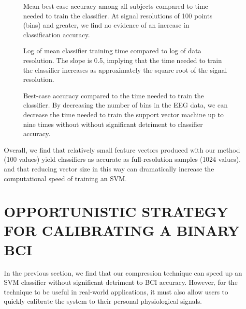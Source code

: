 \begin{figure}[!h]
  \centering
   {}
  \caption{Mean best-case accuracy among all subjects compared to time needed to train the classifier. At signal resolutions of 100 points (bins) and greater, we find no evidence of an increase in classification accuracy. }
  \label{fig:accuracy_vs_bins}
  \vspace{-0.1cm}
 \end{figure}

 \begin{figure}[!h]
  \vspace{-0.2cm}
  \centering
   {}
  \caption{Log of mean classifier training time compared to log of data resolution. The slope is 0.5, implying that the time needed to train the classifier increases as approximately the square root of the signal resolution.}
  \label{fig:training_vs_bins}
  \vspace{-0.1cm}
 \end{figure}

\begin{figure}[!h]
  \vspace{-0.2cm}
  \centering
   {}
  \caption{ Best-case accuracy compared to the time needed to train the classifier. By decreasing the number of bins in the EEG data, we can decrease the time needed to train the support vector machine up to nine times without without significant detriment to classifier accuracy. }
  \label{fig:accuracy_vs_training}
 \end{figure}

Overall, we find that relatively small feature vectors produced with our method (100 values) yield classifiers as accurate as full-resolution samples (1024 values), and that reducing vector size in this way can dramatically increase the computational speed of training an SVM. 


\section{\uppercase{Opportunistic strategy for calibrating a binary BCI}}
\label{sec:calibration_eval}

\noindent In the previous section, we find that our compression technique can speed up an SVM classifier without significant detriment to BCI accuracy. However, for the technique to be useful in real-world applications, it must also allow users to quickly calibrate the system to their personal physiological signals.

